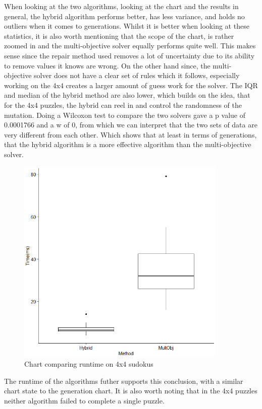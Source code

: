 \documentclass[a4paper,11pt]{article}
\begin{document}
When looking at the two algorithms, looking at the chart and the results in general, the hybrid algorithm performs better, has less variance, and holds no outliers when it comes to generations. Whilst it is better when looking at these statistics, it is also worth mentioning that the scope of the chart, is rather zoomed in and the multi-objective solver equally performs quite well. This makes sense since the repair method used removes a lot of uncertainty due to its ability to remove values it knows are wrong. On the other hand since, the multi-objective solver does not have a clear set of rules which it follows, especially working on the 4x4 creates a larger amount of guess work for the solver. The IQR and median of the hybrid method are also lower, which builds on the idea, that for the 4x4 puzzles, the hybrid can reel in and control the randomness of the mutation. Doing a Wilcoxon test to compare the two solvers gave a p value of 0.0001766 and a w of 0, from which we can interpret that the two sets of data are very different from each other. Which shows that at least in terms of generations, that the hybrid algorithm is a more effective algorithm than the multi-objective solver.
\begin{figure}[h]
	\centering
	\includegraphics[height=10cm,width=10cm]{./Diagrams/barChart4x4Time}
	\caption{Chart comparing runtime on 4x4 sudokus}
\end{figure}
The runtime of the algorithms futher supports this conclusion, with a similar chart state to the generation chart. It is also worth noting that in the 4x4 puzzles neither algorithm failed to complete a single puzzle.
\end{document}
